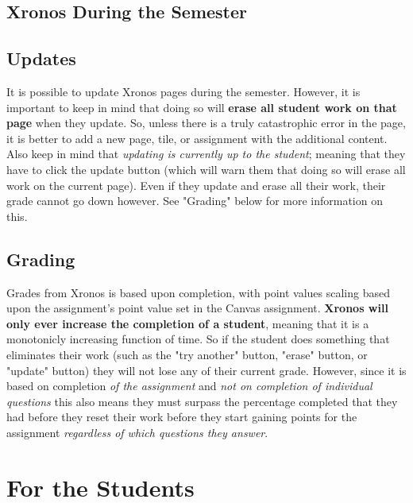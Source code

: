 \documentclass{article}
\begin{document}
\subsection{Xronos During the Semester}

\subsection{Updates}
It is possible to update Xronos pages during the semester. However, it is important to keep in mind that doing so will \textbf{erase all student work on that page} when they update. So, unless there is a truly catastrophic error in the page, it is better to add a new page, tile, or assignment with the additional content. Also keep in mind that \textit{updating is currently up to the student}; meaning that they have to click the update button (which will warn them that doing so will erase all work on the current page). Even if they update and erase all their work, their grade cannot go down however. See "Grading" below for more information on this.

\subsection{Grading}
Grades from Xronos is based upon completion, with point values scaling based upon the assignment's point value set in the Canvas assignment. \textbf{Xronos will only ever increase the completion of a student}, meaning that it is a monotonicly increasing function of time. So if the student does something that eliminates their work (such as the "try another" button, "erase" button, or "update" button) they will not lose any of their current grade. However, since it is based on completion \textit{of the assignment} and \textit{not on completion of individual questions} this also means they must surpass the percentage completed that they had before they reset their work before they start gaining points for the assignment \textit{regardless of which questions they answer}.


\section{For the Students}
\end{document}

